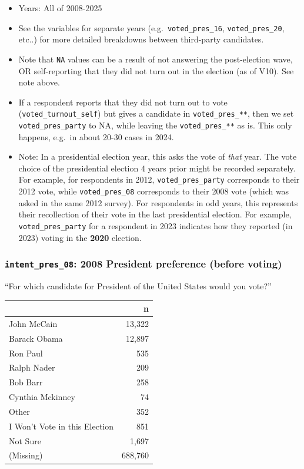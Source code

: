 \documentclass[10pt,article,oneside]{memoir}
\begin{document}
\begin{itemize}
\tightlist
\item
  Years: All of 2008-2025
\item
  See the variables for separate years (e.g.~\texttt{voted\_pres\_16},
  \texttt{voted\_pres\_20}, etc..) for more detailed breakdowns between
  third-party candidates.
\item
  Note that \texttt{NA} values can be a result of not answering the
  post-election wave, OR self-reporting that they did not turn out in
  the election (as of V10). See note above.
\item
  If a respondent reports that they did not turn out to vote
  (\texttt{voted\_turnout\_self}) but gives a candidate in
  \texttt{voted\_pres\_**}, then we set \texttt{voted\_pres\_party} to
  NA, while leaving the \texttt{voted\_pres\_**} as is. This only
  happens, e.g.~in about 20-30 cases in 2024.
\item
  Note: In a presidential election year, this asks the vote of
  \emph{that} year. The vote choice of the presidential election 4 years
  prior might be recorded separately. For example, for respondents in
  2012, \texttt{voted\_pres\_party} corresponds to their 2012 vote,
  while \texttt{voted\_pres\_08} corresponds to their 2008 vote (which
  was asked in the same 2012 survey). For respondents in odd years, this
  represents their recollection of their vote in the last presidential
  election. For example, \texttt{voted\_pres\_party} for a respondent in
  2023 indicates how they reported (in 2023) voting in the \textbf{2020}
  election.
\end{itemize}

\subsubsection{\texorpdfstring{\texttt{intent\_pres\_08}: 2008 President
preference (before
voting)}{intent\_pres\_08: 2008 President preference (before voting)}}\label{intent_pres_08-2008-president-preference-before-voting}

``For which candidate for President of the United States would you
vote?''

\begin{table}[H]
\centering
\begin{tabular}[t]{lr}
\toprule
 & n\\
\midrule
John McCain & 13,322\\
Barack Obama & 12,897\\
Ron Paul & 535\\
Ralph Nader & 209\\
Bob Barr & 258\\
Cynthia Mckinney & 74\\
Other & 352\\
I Won't Vote in this Election & 851\\
Not Sure & 1,697\\
(Missing) & 688,760\\
\bottomrule
\end{tabular}
\end{table}
\end{document}
